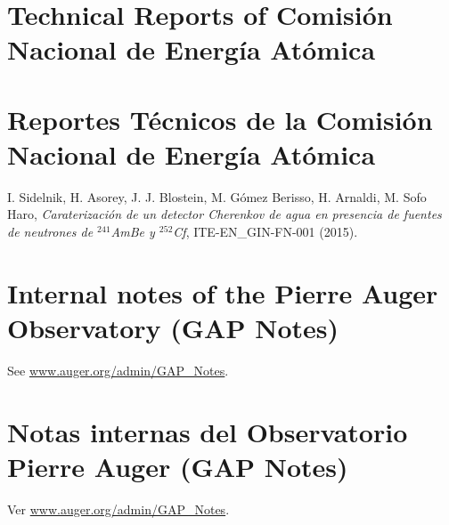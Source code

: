 \ifeng
\section*{Technical Reports of Comisión Nacional de Energía Atómica}
\else
\section*{Reportes Técnicos de la Comisión Nacional de Energía Atómica}
\fi

\noindent
\begin{etaremune}
\item {} I. Sidelnik, H. Asorey, J. J. Blostein, M. Gómez Berisso, H. Arnaldi, M. Sofo Haro, {\emph{Caraterización de un detector Cherenkov de agua en presencia de fuentes de neutrones de $^{241}$AmBe y $^{252}$Cf}}, ITE-EN\_GIN-FN-001 (2015).
\end{etaremune}


\ifeng
\section*{Internal notes of the Pierre Auger Observatory (GAP Notes)}

See \href{http://www.auger.org/admin-cgi-bin/woda/gap\_notes.pl/Search?search=asorey}{www.auger.org/admin/GAP\_Notes}.
\else
\section*{Notas internas del Observatorio Pierre Auger (GAP Notes)}

Ver \href{http://www.auger.org/admin-cgi-bin/woda/gap\_notes.pl/Search?search=asorey}{www.auger.org/admin/GAP\_Notes}.
\fi

